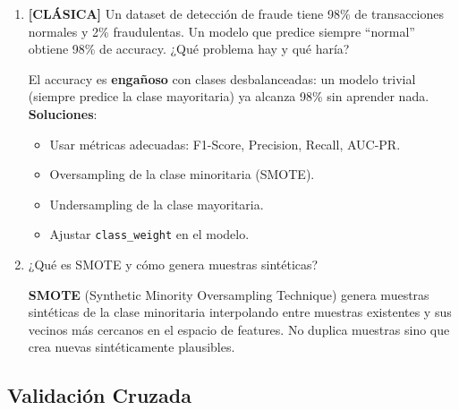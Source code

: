 \documentclass[11pt,a4paper]{article}
\begin{document}
\begin{enumerate}[label=\textbf{P\arabic*.}, resume]

\item \leavevmode

\begin{classicbox}
\textcolor{tdred}{\textbf{[CL\'ASICA]}} Un dataset de detecci\'on de fraude tiene 98\%
de transacciones normales y 2\% fraudulentas. Un modelo que predice siempre ``normal''
obtiene 98\% de accuracy. ¿Qu\'e problema hay y qu\'e har\'ia?
\end{classicbox}

\begin{answerbox}
El accuracy es \textbf{enga\~noso} con clases desbalanceadas: un modelo trivial (siempre
predice la clase mayoritaria) ya alcanza 98\% sin aprender nada.\\[4pt]
\textbf{Soluciones}:
\begin{itemize}[topsep=2pt, itemsep=2pt]
  \item Usar m\'etricas adecuadas: F1-Score, Precision, Recall, AUC-PR.
  \item Oversampling de la clase minoritaria (SMOTE).
  \item Undersampling de la clase mayoritaria.
  \item Ajustar \texttt{class\_weight} en el modelo.
\end{itemize}
\end{answerbox}

\item ¿Qu\'e es SMOTE y c\'omo genera muestras sint\'eticas?

\begin{answerbox}
\textbf{SMOTE} (Synthetic Minority Oversampling Technique) genera muestras sint\'eticas
de la clase minoritaria interpolando entre muestras existentes y sus vecinos m\'as
cercanos en el espacio de features. No duplica muestras sino que crea nuevas
sint\'eticamente plausibles.
\end{answerbox}

\end{enumerate}

\subsection{Validaci\'on Cruzada}
\end{document}

